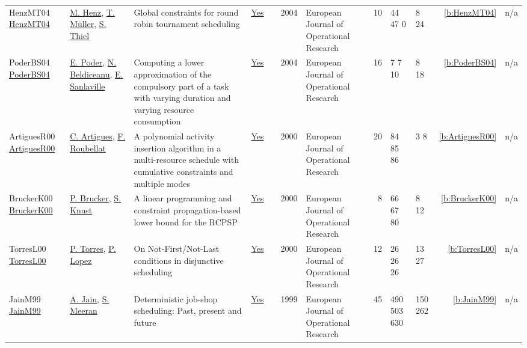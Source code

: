 {\begin{longtable}{>{\raggedright\arraybackslash}p{3cm}>{\raggedright\arraybackslash}p{4.5cm}>{\raggedright\arraybackslash}p{6.0cm}rrrp{2.5cm}rp{1cm}p{1cm}rr}
HenzMT04 \href{http://dx.doi.org/10.1016/s0377-2217(03)00101-2}{HenzMT04} & \hyperref[auth:a1420]{M. Henz}, \hyperref[auth:a1422]{T. M\"{u}ller}, \hyperref[auth:a1423]{S. Thiel} & Global constraints for round robin tournament scheduling & \href{../works/HenzMT04.pdf}{Yes} & \cite{HenzMT04} & 2004 & European Journal of Operational Research & 10 & 44 47 0 & 8 24 & \ref{b:HenzMT04} & n/a\\
PoderBS04 \href{https://doi.org/10.1016/S0377-2217(02)00756-7}{PoderBS04} & \hyperref[auth:a358]{E. Poder}, \hyperref[auth:a128]{N. Beldiceanu}, \hyperref[auth:a713]{E. Sanlaville} & Computing a lower approximation of the compulsory part of a task with varying duration and varying resource consumption & \href{../works/PoderBS04.pdf}{Yes} & \cite{PoderBS04} & 2004 & European Journal of Operational Research & 16 & 7 7 10 & 8 18 & \ref{b:PoderBS04} & n/a\\
ArtiguesR00 \href{https://doi.org/10.1016/S0377-2217(99)00496-8}{ArtiguesR00} & \hyperref[auth:a6]{C. Artigues}, \hyperref[auth:a712]{F. Roubellat} & A polynomial activity insertion algorithm in a multi-resource schedule with cumulative constraints and multiple modes & \href{../works/ArtiguesR00.pdf}{Yes} & \cite{ArtiguesR00} & 2000 & European Journal of Operational Research & 20 & 84 85 86 & 3 8 & \ref{b:ArtiguesR00} & n/a\\
BruckerK00 \href{http://dx.doi.org/10.1016/s0377-2217(99)00489-0}{BruckerK00} & \hyperref[auth:a847]{P. Brucker}, \hyperref[auth:a1167]{S. Knust} & A linear programming and constraint propagation-based lower bound for the RCPSP & \href{../works/BruckerK00.pdf}{Yes} & \cite{BruckerK00} & 2000 & European Journal of Operational Research & 8 & 66 67 80 & 8 12 & \ref{b:BruckerK00} & n/a\\
TorresL00 \href{http://dx.doi.org/10.1016/s0377-2217(99)00497-x}{TorresL00} & \hyperref[auth:a873]{P. Torres}, \hyperref[auth:a3]{P. Lopez} & \cellcolor{green!10}On Not-First/Not-Last conditions in disjunctive scheduling & \href{../works/TorresL00.pdf}{Yes} & \cite{TorresL00} & 2000 & European Journal of Operational Research & 12 & 26 26 26 & 13 27 & \ref{b:TorresL00} & n/a\\
JainM99 \href{http://dx.doi.org/10.1016/s0377-2217(98)00113-1}{JainM99} & \hyperref[auth:a955]{A. Jain}, \hyperref[auth:a956]{S. Meeran} & Deterministic job-shop scheduling: Past, present and future & \href{../works/JainM99.pdf}{Yes} & \cite{JainM99} & 1999 & European Journal of Operational Research & 45 & 490 503 630 & 150 262 & \ref{b:JainM99} & n/a\\

\end{longtable}}
